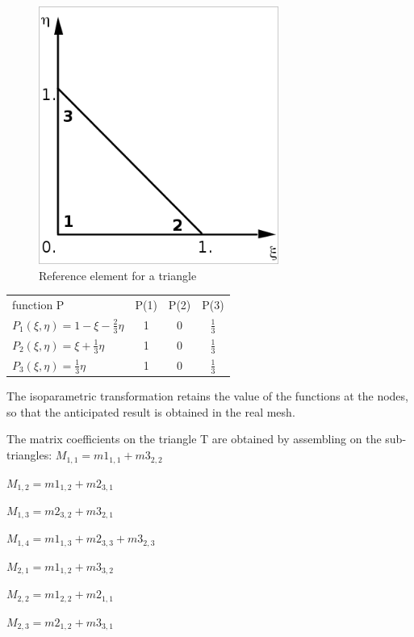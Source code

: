 \begin{figure}[H]%
\begin{center}
%
  \includegraphics[width=0.7\textwidth]{./graphics/ref-triangle}
%
\end{center}
\caption{Reference element for a triangle}
\label{fig:reftriangle}
\end{figure}

\begin{tabular}{lccc}
function P & P(1) & P(2) &  P(3) \\
  $P_{1}(\xi,\eta) = 1 - \xi - \frac{2}{3} \eta$ & 1 & 0 & $\frac{1}{3}$ \\
  $P_{2}(\xi,\eta) = \xi + \frac{1}{3} \eta$ & 1 & 0 & $\frac{1}{3}$ \\
  $P_{3}(\xi,\eta) = \frac{1}{3} \eta$ & 1 & 0 & $\frac{1}{3}$
\end{tabular}

The isoparametric transformation retains the value of the functions at the
nodes, so that the anticipated result is obtained in the real mesh.

The matrix coefficients on the triangle T are obtained by assembling on the
sub-triangles:
$M_{1,1} = m1_{1,1} + m3_{2,2}$

$M_{1,2} = m1_{1,2} + m2_{3,1}$

$M_{1,3} = m2_{3,2} + m3_{2,1}$

$M_{1,4} = m1_{1,3} + m2_{3,3} + m3_{2,3}$

$M_{2,1} = m1_{1,2} + m3_{3,2}$

$M_{2,2} = m1_{2,2} + m2_{1,1}$

$M_{2,3} = m2_{1,2} + m3_{3,1}$


